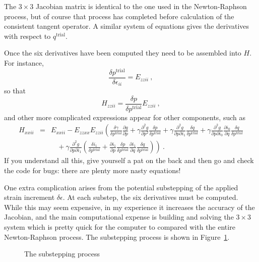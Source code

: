 \documentclass[]{scrreprt}
\begin{document}
The $3\times 3$ Jacobian matrix is identical to the one used in the
Newton-Raphson process, but of course that process has completed
before calculation of the consistent tangent operator.  A similar
system of equations gives the derivatives with respect to
$q^{\mathrm{trial}}$.

Once the six derivatives have been computed they need to be assembled
into $H$.  For instance,
\begin{equation}
\frac{\delta p^{\mathrm{trial}}}{\delta \epsilon_{ii}} = E_{zzii}
\ ,
\end{equation}
so that
\begin{equation}
H_{zzii} = \frac{\delta p}{\delta p^{\mathrm{trial}}} E_{zzii} \ ,
\end{equation}
and other more complicated expressions appear for other components,
such as
\begin{eqnarray}
H_{xxii} & = & E_{xxii} - E_{zzxx} E_{zzii}\left( \frac{\delta \gamma}{\delta
  p^{\mathrm{trial}}} \frac{\partial g}{\partial p}
+ \gamma \frac{\partial^{2} g}{\partial p^{2}} \frac{\delta
  p}{\delta p^{\mathrm{trial}}}
+ \gamma \frac{\partial^{2} g}{\partial p\partial i_{1}} \frac{\delta
  q}{\delta p^{\mathrm{trial}}}
+ \gamma \frac{\partial^{2} g}{\partial p\partial i_{0}}
\frac{\partial i_{0}}{\partial q} \frac{\delta
  q}{\delta p^{\mathrm{trial}}} \right.
\nonumber \\
&& \ \ \ \
+ \left.
\gamma \frac{\partial^{2} g}{\partial p\partial i_{1}} \left(
\frac{\delta i_{1}}{\delta p^{\mathrm{trial}}} +
\frac{\partial i_{1}}{\partial p} \frac{\delta p}{\delta p^{\mathrm{trial}}}
\frac{\partial i_{1}}{\partial q} \frac{\delta q}{\delta
  p^{\mathrm{trial}}}
\right) \right) \ .
\end{eqnarray}
If you understand all this, give yourself a pat on the back and then
go and check the code for bugs: there are plenty more nasty equations!

One extra complication arises from the potential substepping of the
applied strain increment $\delta\epsilon$.  At each substep,
the six derivatives must be computed.  While this may seem expensive,
in my experience it increases the accuracy of the Jacobian, and the
main computational expense is building and solving the $3\times 3$
system which is pretty quick for the computer to compared with the
entire Newton-Raphson process.  The substepping process is shown in
Figure~\ref{substep.fig}.

\begin{figure}[htb]
\begin{center}
\caption{The substepping process}
\label{substep.fig}
\end{center}
\end{figure}
\end{document}

